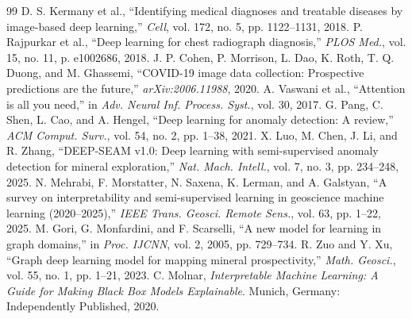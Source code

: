 \documentclass{jcst}
\begin{document}
\begin{thebibliography}{99}
 D. S. Kermany et al., ``Identifying medical diagnoses and treatable diseases by image-based deep learning,'' \textit{Cell}, vol. 172, no. 5, pp. 1122–1131, 2018.
 P. Rajpurkar et al., ``Deep learning for chest radiograph diagnosis,'' \textit{PLOS Med.}, vol. 15, no. 11, p. e1002686, 2018.
 J. P. Cohen, P. Morrison, L. Dao, K. Roth, T. Q. Duong, and M. Ghassemi, ``COVID-19 image data collection: Prospective predictions are the future,'' \textit{arXiv:2006.11988}, 2020.
 A. Vaswani et al., ``Attention is all you need,'' in \textit{Adv. Neural Inf. Process. Syst.}, vol. 30, 2017.
 G. Pang, C. Shen, L. Cao, and A. Hengel, ``Deep learning for anomaly detection: A review,'' \textit{ACM Comput. Surv.}, vol. 54, no. 2, pp. 1–38, 2021.
 X. Luo, M. Chen, J. Li, and R. Zhang, ``DEEP-SEAM v1.0: Deep learning with semi-supervised anomaly detection for mineral exploration,'' \textit{Nat. Mach. Intell.}, vol. 7, no. 3, pp. 234–248, 2025.
 N. Mehrabi, F. Morstatter, N. Saxena, K. Lerman, and A. Galstyan, ``A survey on interpretability and semi-supervised learning in geoscience machine learning (2020–2025),'' \textit{IEEE Trans. Geosci. Remote Sens.}, vol. 63, pp. 1–22, 2025.
 M. Gori, G. Monfardini, and F. Scarselli, ``A new model for learning in graph domains,'' in \textit{Proc. IJCNN}, vol. 2, 2005, pp. 729–734.
 R. Zuo and Y. Xu, ``Graph deep learning model for mapping mineral prospectivity,'' \textit{Math. Geosci.}, vol. 55, no. 1, pp. 1–21, 2023.
 C. Molnar, \textit{Interpretable Machine Learning: A Guide for Making Black Box Models Explainable}. Munich, Germany: Independently Published, 2020.
\end{thebibliography}
\end{document}
